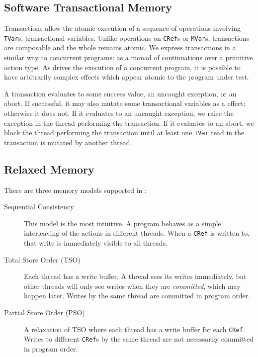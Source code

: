 \subsection{Software Transactional Memory}

Transactions allow the atomic execution of a sequence of operations
involving \verb|TVar|s, transactional variables.  Unlike operations on
\verb|CRef|s or \verb|MVar|s, transactions are composable and the
whole remains atomic.  We express transactions in a similar way to
concurrent programs: as a monad of continuations over a primitive
action type.  As \dejafu{} drives the execution of a concurrent
program, it is possible to have arbitrarily complex effects which
appear atomic to the program under test.

A transaction evaluates to some success value, an uncaught exception,
or an abort.  If successful, it may also mutate some transactional
variables as a effect; otherwise it does not.  If it evaluates to an
uncaught exception, we raise the exception in the thread performing
the transaction.  If it evaluates to an abort, we block the thread
performing the transaction until at least one \verb|TVar| read in the
transaction is mutated by another thread.

\subsection{Relaxed Memory}

There are three memory models supported in \dejafu{}:

\begin{description}
\item[Sequential Consistency] This model is the most intuitive.  A program
  behaves as a simple interleaving of the actions in different threads.  When a
  \texttt{CRef} is written to, that write is immediately visible to all
  threads.

\item[Total Store Order (TSO)] Each thread has a write buffer.  A thread sees
  its writes immediately, but other threads will only see writes when they are
  \emph{committed}, which may happen later.  Writes by the same thread are
  committed in program order.

\item[Partial Store Order (PSO)] A relaxation of TSO where each thread has a
  write buffer for each \verb|CRef|.  Writes to different \verb|CRef|s by the
  same thread are not necessarily committed in program order.
\end{description}

